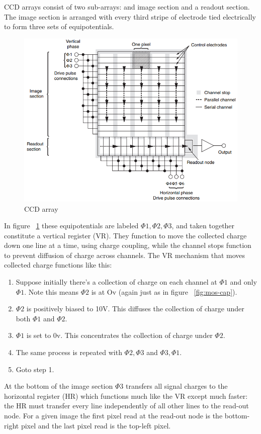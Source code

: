 CCD arrays consist of two sub-arrays: and image section and a readout section.
%
The image section is arranged with every third stripe of electrode tied electrically to form three sets of equipotentials.
\begin{figure}
    \includegraphics[width=\linewidth,keepaspectratio]{figures/ccd_array.png}
    \caption{CCD array\cite{pawley1995handbook}}
    \label{fig:ccd-array}
\end{figure}
%
In figure ~\ref{fig:ccd-array} these equipotentials are labeled $\Phi1, \Phi2, \Phi3$, and taken together constitute a vertical register (VR).
%
They function to move the collected charge down one line at a time, using charge coupling, while the channel stops function to prevent diffusion of charge across channels.
%
The VR mechanism that moves collected charge functions like this:
\begin{enumerate}
    \item Suppose initially there's a collection of charge on each channel at $\Phi1$ and only $\Phi1$. Note this means $\Phi2$ is at Ov (again just as in figure ~\ref{fig:mos-cap}).
    \item $\Phi2$ is positively biased to 10V. This diffuses the collection of charge under both $\Phi1$ and $\Phi2$.
    \item $\Phi1$ is set to 0v. This concentrates the collection of charge under $\Phi2$.
    \item The same process is repeated with $\Phi2, \Phi3$ and $\Phi3, \Phi1$.
    \item Goto step 1.
\end{enumerate}
At the bottom of the image section $\Phi3$ transfers all signal charges to the horizontal register (HR) which functions much like the VR except much faster: the HR must transfer every line independently of all other lines to the read-out node. For a given image the first pixel read at the read-out node is the bottom-right pixel and the last pixel read is the top-left pixel.

